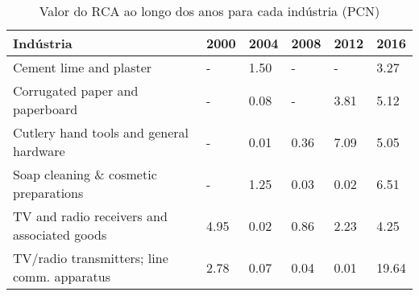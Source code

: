 \begin{table}
\centering
\caption{Valor do RCA ao longo dos anos para cada indústria (PCN)}
\label{tab:ex3-tempo-PCN}
\begin{tabular}{p{6cm}p{1.5cm}p{1.5cm}p{1.5cm}p{1.5cm}p{1.5cm}}
\toprule
                                  Indústria & 2000 & 2004 & 2008 & 2012 &  2016 \\
\midrule
                    Cement lime and plaster &    - & 1.50 &    - &    - &  3.27 \\
            Corrugated paper and paperboard &    - & 0.08 &    - & 3.81 &  5.12 \\
    Cutlery hand tools and general hardware &    - & 0.01 & 0.36 & 7.09 &  5.05 \\
      Soap cleaning \& cosmetic preparations &    - & 1.25 & 0.03 & 0.02 &  6.51 \\
TV and radio receivers and associated goods & 4.95 & 0.02 & 0.86 & 2.23 &  4.25 \\
TV/radio transmitters; line comm. apparatus & 2.78 & 0.07 & 0.04 & 0.01 & 19.64 \\
\bottomrule
\end{tabular}
\end{table}
